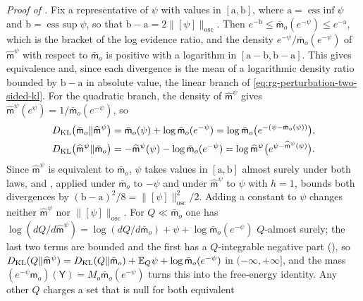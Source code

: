 \noindent\emph{Proof of .}
Fix a representative of $\psi$ with values in $[\mathrm a,\mathrm b]$, where
$\mathrm a=\operatorname*{ess~inf}\psi$ and $\mathrm b=\operatorname*{ess~sup}\psi$, so
that $\mathrm b-\mathrm a=2\lVert[\psi]\rVert_{\mathrm{osc}}$. Then
$e^{-\mathrm b}\le\bar{\mathsf m}_o(e^{-\psi})\le e^{-\mathrm a}$, which is the bracket
of the log evidence ratio, and the density $e^{-\psi}/\bar{\mathsf m}_o(e^{-\psi})$ of
$\widehat{\mathsf m}^\psi$ with respect to $\bar{\mathsf m}_o$ is positive with a
logarithm in $[\mathrm a-\mathrm b,\mathrm b-\mathrm a]$. This gives equivalence and,
since each divergence is the mean of a logarithmic density ratio bounded by
$\mathrm b-\mathrm a$ in absolute value, the linear branch of
\eqref{eq:rg-perturbation-two-sided-kl}. For the quadratic branch, the density of
$\widehat{\mathsf m}^\psi$ gives $\widehat{\mathsf m}^\psi(e^{\psi})=1/\bar{\mathsf m}_o(e^{-\psi})$, so
\begin{align*}
D_{\mathrm{KL}}\bigl(\bar{\mathsf m}_o\Vert\widehat{\mathsf m}^\psi\bigr)
&=\bar{\mathsf m}_o(\psi)+\log\bar{\mathsf m}_o(e^{-\psi})
=\log\bar{\mathsf m}_o\bigl(e^{-(\psi-\bar{\mathsf m}_o(\psi))}\bigr),\\
D_{\mathrm{KL}}\bigl(\widehat{\mathsf m}^\psi\Vert\bar{\mathsf m}_o\bigr)
&=-\widehat{\mathsf m}^\psi(\psi)-\log\bar{\mathsf m}_o(e^{-\psi})
=\log\widehat{\mathsf m}^\psi\bigl(e^{\psi-\widehat{\mathsf m}^\psi(\psi)}\bigr).
\end{align*}
Since $\widehat{\mathsf m}^\psi$ is equivalent to $\bar{\mathsf m}_o$, $\psi$ takes values in
$[\mathrm a,\mathrm b]$ almost surely under both laws, and
\citet[Sec.~4, Eq.~(4.16)]{Hoeffding1963}, applied under $\bar{\mathsf m}_o$ to $-\psi$ and under
$\widehat{\mathsf m}^\psi$ to $\psi$ with $h=1$, bounds both divergences by
$(\mathrm b-\mathrm a)^2/8=\lVert[\psi]\rVert_{\mathrm{osc}}^2/2$.
Adding a constant to $\psi$ changes neither $\widehat{\mathsf m}^\psi$ nor
$\lVert[\psi]\rVert_{\mathrm{osc}}$. For $Q\ll\bar{\mathsf m}_o$ one has
$\log(dQ/d\widehat{\mathsf m}^\psi)=\log(dQ/d\bar{\mathsf m}_o)+\psi
+\log\bar{\mathsf m}_o(e^{-\psi})$ $Q$-almost surely; the last two terms are bounded and
the first has a $Q$-integrable negative part
(), so
$D_{\mathrm{KL}}(Q\Vert\widehat{\mathsf m}^\psi)=D_{\mathrm{KL}}(Q\Vert\bar{\mathsf m}_o)+\mathbb E_Q\psi
+\log\bar{\mathsf m}_o(e^{-\psi})$ in $(-\infty,+\infty]$, and the mass
$(e^{-\psi}\mathsf m_o)(\mathsf Y)=M_o\bar{\mathsf m}_o(e^{-\psi})$ turns this into the
free-energy identity. Any other $Q$ charges a set that is null for both equivalent
